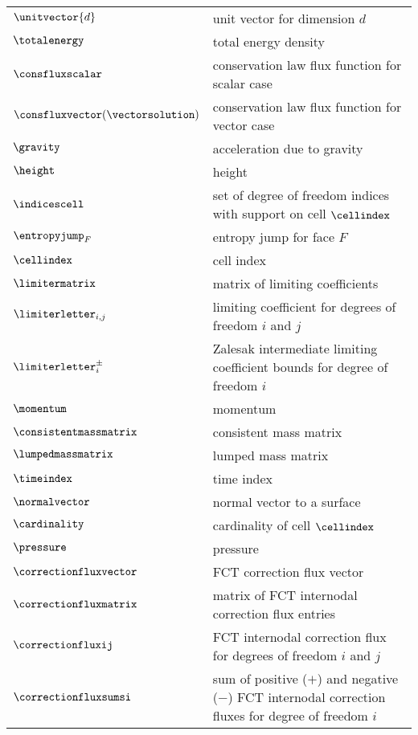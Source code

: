 \begin{center}
\begin{longtable}{l p{4.8in}}
$\unitvector{d}$   & unit vector for dimension $d$\\
$\totalenergy$     & total energy density\\
$\consfluxscalar$  & conservation law flux function for scalar case\\
$\consfluxvector(\vectorsolution)$  & conservation law flux function for vector case\\
$\gravity$         & acceleration due to gravity\\
$\height$          & height\\
$\indicescell$     & set of degree of freedom indices with support on
                     cell $\cellindex$\\
$\entropyjump_F$ & entropy jump for face $F$\\
$\cellindex$       & cell index\\

$\limitermatrix$   & matrix of limiting coefficients\\
$\limiterletter_{i,j}$ & limiting coefficient for degrees of freedom $i$
                         and $j$\\
$\limiterletter^\pm_i$ & Zalesak intermediate limiting coefficient bounds for
                         degree of freedom $i$\\
$\momentum$        & momentum\\
$\consistentmassmatrix$ & consistent mass matrix\\
$\lumpedmassmatrix$ & lumped mass matrix\\

$\timeindex$       & time index\\
$\normalvector$    & normal vector to a surface\\
$\cardinality$     & cardinality of cell $\cellindex$\\
$\pressure$        & pressure\\
$\correctionfluxvector$ & FCT correction flux vector\\
$\correctionfluxmatrix$ & matrix of FCT internodal correction flux entries\\
$\correctionfluxij$ & FCT internodal correction flux for degrees of freedom
                      $i$ and $j$\\
$\correctionfluxsumsi$ & sum of positive ($+$) and negative ($-$) FCT internodal
                         correction fluxes for degree of freedom $i$\\


\end{longtable}
\end{center}
